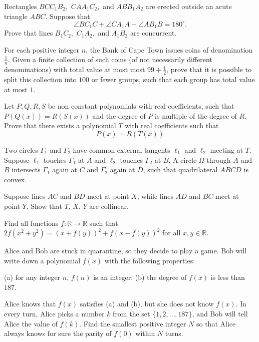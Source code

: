 \documentclass[11pt]{scrartcl}
\begin{document}
\begin{problem}[942225649898797]
Rectangles $BCC_1B_2,$ $CAA_1C_2,$ and $ABB_1A_2$ are erected outside an acute triangle $ABC.$ Suppose that\[\angle BC_1C+\angle CA_1A+\angle AB_1B=180^{\circ}.\]Prove that lines $B_1C_2,$ $C_1A_2,$ and $A_1B_2$ are concurrent.
\end{problem}
\begin{problem}[944096417683669]
For each positive integer $n$, the Bank of Cape Town issues coins of denomination $\frac1n$. Given a finite collection of such coins (of not necessarily different denominations) with total value at most most $99+\frac12$, prove that it is possible to split this collection into $100$ or fewer groups, such that each group has total value at most $1$.
\end{problem}
\begin{problem}[945040565828830]
Let $P,Q,R,S$ be non constant polynomials with real coefficients, such that $P(Q(x))=R(S(x)) $ and the degree of $P$ is multiple of the degree of $R. $ Prove that there exists a polynomial $T$ with real coefficients such that
$$\displaystyle P(x)=R(T(x))$$
\end{problem}
\begin{problem}[945532205287762]
Two circles $\Gamma_1$ and $\Gamma_2$ have common external tangents $\ell_1$ and $\ell_2$ meeting at $T$. Suppose $\ell_1$ touches $\Gamma_1$ at $A$ and $\ell_2$ touches $\Gamma_2$ at $B$. A circle $\Omega$ through $A$ and $B$ intersects $\Gamma_1$ again at $C$ and $\Gamma_2$ again at $D$, such that quadrilateral $ABCD$ is convex.

Suppose lines $AC$ and $BD$ meet at point $X$, while lines $AD$ and $BC$ meet at point $Y$. Show that $T$, $X$, $Y$ are collinear.
\end{problem}
\begin{problem}[951015231425815]
	Find all functions $f:\mathbb{R}\rightarrow\mathbb{R}$ such that $2f(x^2+y^2)=(x+f(y))^2+f(x-f(y))^2$ for all $x,y\in\mathbb{R}$.
\end{problem}
\begin{problem}[951994777136316]
Alice and Bob are stuck in quarantine, so they decide to play a game. Bob will write down a polynomial $f(x)$ with the following properties:

(a) for any integer $n$, $f(n)$ is an integer;
(b) the degree of $f(x)$ is less than $187$.

Alice knows that $f(x)$ satisfies (a) and (b), but she does not know $f(x)$. In every turn, Alice picks a number $k$ from the set $\{1,2,\ldots,187\}$, and Bob will tell Alice the value of $f(k)$. Find the smallest positive integer $N$ so that Alice always knows for sure the parity of $f(0)$ within $N$ turns.
\end{problem}
\end{document}
